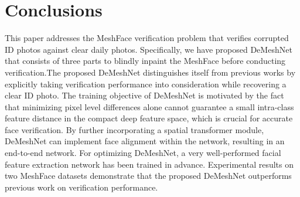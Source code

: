 \documentclass[10pt,twocolumn,letterpaper]{article}
\begin{document}



\section{Conclusions}

This paper addresses the MeshFace verification problem that verifies corrupted ID photos against clear daily photos. Specifically, we have proposed DeMeshNet that consists of three parts to blindly inpaint the MeshFace before conducting verification.The proposed DeMeshNet distinguishes itself from previous works by explicitly taking verification performance into consideration while recovering a clear ID photo. The training objective of DeMeshNet is motivated by the fact that minimizing pixel level differences alone cannot guarantee a small intra-class feature distance in the compact deep feature space, which is crucial for accurate face verification. By further incorporating a spatial transformer module, DeMeshNet can implement face alignment within the network, resulting in an end-to-end network. For optimizing DeMeshNet, a very well-performed facial feature extraction network has been trained in advance. Experimental results on two MeshFace datasets demonstrate that the proposed DeMeshNet outperforms previous work on verification performance.

\end{document}
